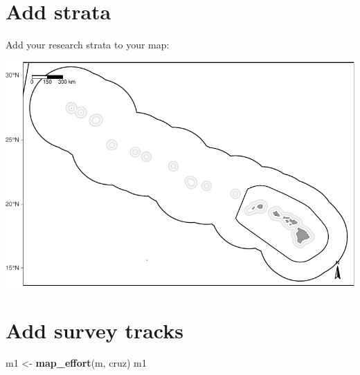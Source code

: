 \documentclass[
]{book}
\newenvironment{Shaded}{\begin{snugshade}}{\end{snugshade}}
\newcommand{\DataTypeTok}[1]{\textcolor[rgb]{0.13,0.29,0.53}{#1}}
\newcommand{\KeywordTok}[1]{\textcolor[rgb]{0.13,0.29,0.53}{\textbf{#1}}}
\newcommand{\NormalTok}[1]{#1}
\newcommand{\OperatorTok}[1]{\textcolor[rgb]{0.81,0.36,0.00}{\textbf{#1}}}
\newcommand{\StringTok}[1]{\textcolor[rgb]{0.31,0.60,0.02}{#1}}
\begin{document}
\hypertarget{add-strata}{%
\section*{Add strata}\label{add-strata}}

Add your research strata to your map:

\begin{Shaded}
\end{Shaded}

\includegraphics{figures/unnamed-chunk-57-1.pdf}

\hypertarget{add-survey-tracks}{%
\section*{Add survey tracks}\label{add-survey-tracks}}

\begin{Shaded}
\begin{Highlighting}[]
\NormalTok{m1 <-}\StringTok{ }\KeywordTok{map_effort}\NormalTok{(m, cruz)}
\NormalTok{m1}
\end{Highlighting}
\end{Shaded}
\end{document}
